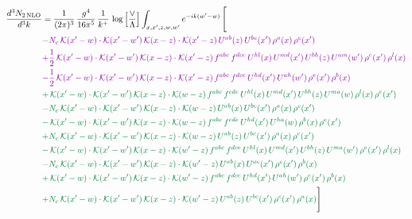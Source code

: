 \documentclass[10pt]{article}
\numberwithin{equation}{section}
\begin{document}
\begin{align}
\frac{d^{3}N_{2\,\mathrm{NLO}}}{d^{3}k} & = \frac{1}{(2\pi)^{3}}\,\frac{g^{4}}{16\pi^{5}}\,\frac{1}{k^{+}}\,\log\Big[\frac{\vee}{\Lambda}\Big]\int_{x,x',z,w,w'}e^{-ik(w'-w)}\,\Bigg[\notag\\ &{\color{CC} -N_{c}\,\mathcal{K}(x'-w)\cdot\mathcal{K}(x'-w')\,\mathcal{K}(x-z)\cdot\mathcal{K}(x'-z)\,U^{ab}(z)\,U^{bc}(x')\,\rho^{a}(x)\,\rho^{c}(x')} \notag\\
&{\color{CC} +\frac{1}{2}\,\mathcal{K}(x'-w)\cdot\mathcal{K}(x'-w')\,\mathcal{K}(x-z)\cdot\mathcal{K}(x'-z)\,f^{abc}\,f^{dce}\,U^{hl}(x)\,U^{md}(x')\,U^{bh}(z)\,U^{am}(w')\,\rho^{e}(x')\,\rho^{l}(x)} \notag\\
&{\color{CC} -\frac{1}{2}\,\mathcal{K}(x'-w)\cdot\mathcal{K}(x'-w')\,\mathcal{K}(x-z)\cdot\mathcal{K}(x'-z)\,f^{abc}\,f^{dce}\,U^{hd}(x')\,U^{ah}(w')\,\rho^{e}(x')\,\rho^{b}(x)} \notag\\
&{\color{JIM} +\,\mathcal{K}(x'-w)\cdot\mathcal{K}(x'-w')\,\mathcal{K}(x-z)\cdot\mathcal{K}(w-z)\,f^{abc}\,f^{cde}\,U^{hl}(x)\,U^{md}(x')\,U^{bh}(z)\,U^{ma}(w)\,\rho^{l}(x)\,\rho^{e}(x')} \notag\\
&{\color{JIM} -N_{c}\,\mathcal{K}(x'-w)\cdot\mathcal{K}(x'-w')\,\mathcal{K}(x-z)\cdot\mathcal{K}(w-z)\,U^{ab}(x)\,U^{bc}(x')\,\rho^{a}(x)\,\rho^{c}(x')} \notag\\
&{\color{JIM} -\,\mathcal{K}(x'-w)\cdot\mathcal{K}(x'-w')\,\mathcal{K}(x-z)\cdot\mathcal{K}(w-z)\,f^{abc}\,f^{cde}\,U^{hd}(x')\,U^{ha}(w)\,\rho^{b}(x)\,\rho^{e}(x')} \notag\\
&{\color{JIM} +N_{c}\,\mathcal{K}(x'-w)\cdot\mathcal{K}(x'-w')\,\mathcal{K}(x-z)\cdot\mathcal{K}(w-z)\,U^{ab}(z)\,U^{bc}(x')\,\rho^{a}(x)\,\rho^{c}(x')} \notag\\
&{\color{JIM} -\,\mathcal{K}(x'-w)\cdot\mathcal{K}(x'-w')\,\mathcal{K}(x-z)\cdot\mathcal{K}(w'-z)\,f^{abc}\,f^{dce}\,U^{hl}(x)\,U^{md}(x')\,U^{bh}(z)\,U^{ma}(w')\,\rho^{e}(x')\,\rho^{l}(x)} \notag\\
&{\color{JIM} -N_{c}\,\mathcal{K}(x'-w)\cdot\mathcal{K}(x'-w')\,\mathcal{K}(x-z)\cdot\mathcal{K}(w'-z)\,U^{ab}(x)\,U^{ac}(x')\,\rho^{c}(x')\,\rho^{b}(x)} \notag\\
&{\color{JIM} +\,\mathcal{K}(x'-w)\cdot\mathcal{K}(x'-w')\,\mathcal{K}(x-z)\cdot\mathcal{K}(w'-z)\,f^{abc}\,f^{dce}\,U^{hd}(x')\,U^{ah}(w')\,\rho^{e}(x')\,\rho^{b}(x)} \notag\\
&{\color{JIM} +N_{c}\,\mathcal{K}(x'-w)\cdot\mathcal{K}(x'-w')\,\mathcal{K}(x-z)\cdot\mathcal{K}(w'-z)\,U^{ab}(z)\,U^{bc}(x')\,\rho^{c}(x')\,\rho^{a}(x)}\Bigg] \end{align}
\end{document}
